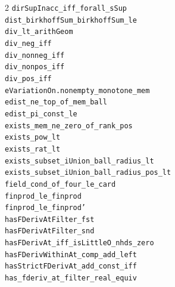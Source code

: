 \documentclass[10pt,a4paper]{article}
\begin{document}
\begin{multicols}{2}
\texttt{dirSupInacc\_iff\_forall\_sSup} \\
\texttt{dist\_birkhoffSum\_birkhoffSum\_le} \\
\texttt{div\_lt\_arithGeom} \\
\texttt{div\_neg\_iff} \\
\texttt{div\_nonneg\_iff} \\
\texttt{div\_nonpos\_iff} \\
\texttt{div\_pos\_iff} \\
\texttt{eVariationOn.\allowbreak{}nonempty\_monotone\_mem} \\
\texttt{edist\_ne\_top\_of\_mem\_ball} \\
\texttt{edist\_pi\_const\_le} \\
\texttt{exists\_mem\_ne\_zero\_of\_rank\_pos} \\
\texttt{exists\_pow\_lt} \\
\texttt{exists\_rat\_lt} \\
\texttt{exists\_subset\_iUnion\_ball\_radius\_lt} \\
\texttt{exists\_subset\_iUnion\_ball\_radius\_pos\_lt} \\
\texttt{field\_cond\_of\_four\_le\_card} \\
\texttt{finprod\_le\_finprod} \\
\texttt{finprod\_le\_finprod'} \\
\texttt{hasFDerivAtFilter\_fst} \\
\texttt{hasFDerivAtFilter\_snd} \\
\texttt{hasFDerivAt\_iff\_isLittleO\_nhds\_zero} \\
\texttt{hasFDerivWithinAt\_comp\_add\_left} \\
\texttt{hasStrictFDerivAt\_add\_const\_iff} \\
\texttt{has\_fderiv\_at\_filter\_real\_equiv} \\

\end{multicols}
\end{document}

